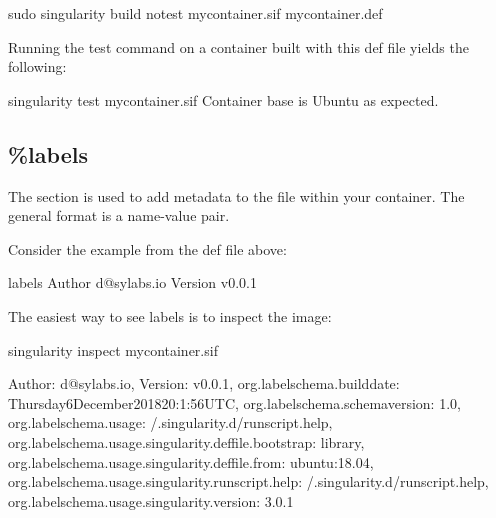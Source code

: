 \documentclass[letterpaper,10pt,english]{sphinxmanual}
\begin{document}
%
\begin{sphinxVerbatim}[commandchars=\\\{\}]
\PYGZdl{} sudo singularity build \PYGZhy{}\PYGZhy{}notest my\PYGZus{}container.sif my\PYGZus{}container.def
\end{sphinxVerbatim}

Running the test command on a container built with this def file yields the
following:

%
\begin{sphinxVerbatim}[commandchars=\\\{\}]
\PYGZdl{} singularity test my\PYGZus{}container.sif
Container base is Ubuntu as expected.
\end{sphinxVerbatim}


\subsection{\%labels}
\label{\detokenize{definition_files:labels}}
The  section is used to add metadata to the file
 within your container. The general format is a
name-value pair.

Consider the example from the def file above:

%
\begin{sphinxVerbatim}[commandchars=\\\{\}]
\PYGZpc{}labels
    Author d@sylabs.io
    Version v0.0.1
\end{sphinxVerbatim}

The easiest way to see labels is to inspect the image:

%
\begin{sphinxVerbatim}[commandchars=\\\{\}]
\PYGZdl{} singularity inspect my\PYGZus{}container.sif

\PYGZob{}
    \PYGZdq{}Author\PYGZdq{}: \PYGZdq{}d@sylabs.io\PYGZdq{},
    \PYGZdq{}Version\PYGZdq{}: \PYGZdq{}v0.0.1\PYGZdq{},
    \PYGZdq{}org.label\PYGZhy{}schema.build\PYGZhy{}date\PYGZdq{}: \PYGZdq{}Thursday\PYGZus{}6\PYGZus{}December\PYGZus{}2018\PYGZus{}20:1:56\PYGZus{}UTC\PYGZdq{},
    \PYGZdq{}org.label\PYGZhy{}schema.schema\PYGZhy{}version\PYGZdq{}: \PYGZdq{}1.0\PYGZdq{},
    \PYGZdq{}org.label\PYGZhy{}schema.usage\PYGZdq{}: \PYGZdq{}/.singularity.d/runscript.help\PYGZdq{},
    \PYGZdq{}org.label\PYGZhy{}schema.usage.singularity.deffile.bootstrap\PYGZdq{}: \PYGZdq{}library\PYGZdq{},
    \PYGZdq{}org.label\PYGZhy{}schema.usage.singularity.deffile.from\PYGZdq{}: \PYGZdq{}ubuntu:18.04\PYGZdq{},
    \PYGZdq{}org.label\PYGZhy{}schema.usage.singularity.runscript.help\PYGZdq{}: \PYGZdq{}/.singularity.d/runscript.help\PYGZdq{},
    \PYGZdq{}org.label\PYGZhy{}schema.usage.singularity.version\PYGZdq{}: \PYGZdq{}3.0.1\PYGZdq{}
\PYGZcb{}
\end{sphinxVerbatim}
\end{document}

